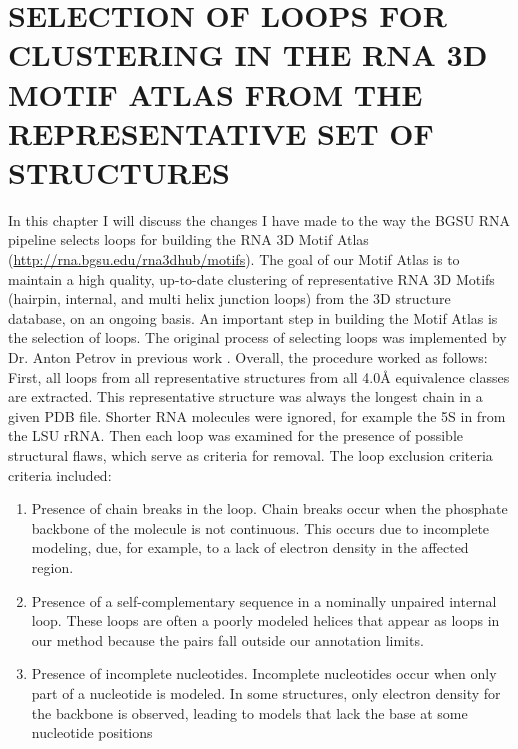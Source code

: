 \chapter{SELECTION OF LOOPS FOR CLUSTERING IN THE RNA 3D MOTIF ATLAS FROM THE
REPRESENTATIVE SET OF STRUCTURES}

In this chapter I will discuss the changes I have made to the way the BGSU RNA
pipeline selects loops for building the RNA 3D Motif Atlas
(\href{http://rna.bgsu.edu/rna3dhub/motifs}{http://rna.bgsu.edu/rna3dhub/motifs}).
The goal of our Motif Atlas is to maintain a high quality, up-to-date clustering
of representative RNA 3D Motifs (hairpin, internal, and multi helix junction
loops) from the 3D structure database, on an ongoing basis. An important step in
building the Motif Atlas is the selection of loops. The original process of
selecting loops was implemented by Dr. Anton Petrov in previous work
\cite{Petrov2012}. Overall, the procedure worked as follows: First, all loops
from all representative structures from all 4.0{\AA} equivalence classes are
extracted. This representative structure was always the longest chain in a given PDB
file. Shorter RNA molecules were ignored, for example the 5S in from the LSU
rRNA. Then each loop was examined for the presence of possible structural flaws,
which serve as criteria for removal. The loop exclusion criteria criteria
included:

\begin{enumerate}
  \item Presence of chain breaks in the loop. Chain breaks occur when the
    phosphate backbone of the molecule is not continuous. This occurs due to
    incomplete modeling, due, for example, to a lack of electron density in the
    affected region.

  \item Presence of a self-complementary sequence in a nominally unpaired
    internal loop. These loops are often a poorly modeled helices that appear as
    loops in our method because the pairs fall outside our annotation limits.

  \item Presence of incomplete nucleotides. Incomplete nucleotides occur when
    only part of a nucleotide is modeled. In some structures, only electron
    density for the backbone is observed, leading to models that lack the base
    at some nucleotide positions
\end{enumerate}


